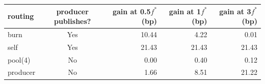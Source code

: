 \begin{tabular}{|l|c|r|r|r|}
\hline
\rowcolor{gray!15}routing & producer publishes? & gain at 0.5$f^*$ (bp) & gain at 1$f^*$ (bp) & gain at 3$f^*$ (bp) \\
\hline
burn & Yes & 10.44 & 4.22 & 0.01 \\
\hline
self & Yes & 21.43 & 21.43 & 21.43 \\
\hline
pool(4) & No & 0.00 & 0.40 & 0.12 \\
\hline
producer & No & 1.66 & 8.51 & 21.22 \\
\hline
\end{tabular}
